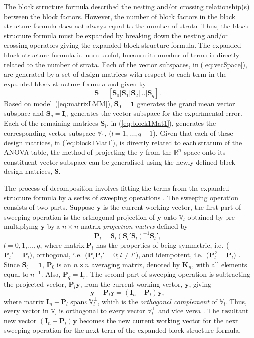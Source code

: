\documentclass[article]{jss}
\newcommand{\mP}{\mathbf{P}}
\newcommand{\I}{\mathbf{I}}
\newcommand{\K}{\mathbf{K}}
\newcommand{\mS}{\mathbf{S}}
\begin{document}
The block structure formula described the nesting and/or crossing relationship(s) between the block factors. However, the number of block factors in the block structure formula does not always equal to the number of strata. Thus, the block structure formula must be expanded by breaking down the nesting and/or crossing operators giving the expanded block structure formula. The expanded block structure formula is more useful, because its number of terms is directly related to the number of strata. Each of the vector subspaces, in (\ref{eq:vecSpace}), are generated by a set of design matrices with respect to each term in the expanded block structure formula and given by
\begin{equation}\label{eq:block1Mat1}
 \mS = [\mS_0 \vert \mS_1 \vert \mS_2 \vert \ldots \vert \mS_q].
\end{equation}
Based on model~(\ref{eq:matrixLMM}), $\mS_0 = \mathbf{1}$ generates the grand mean vector subspace and $\mS_q = \I_n$ generates the vector subspace for the experimental error. Each of the remaining matrices $\mS_l$, in (\ref{eq:block1Mat1}), generates the corresponding vector subspace $\mathbb{V}_1$, ($l = 1, \dots, q-1$). Given that each of these design matrices, in (\ref{eq:block1Mat1}), is directly related to each stratum of the ANOVA table, the method of projecting the $\bm{y}$ from the $\mathbb{R}^n$ space onto its constituent vector subspace can be generalised using the newly defined block design matrices, $\mS$.  

The process of decomposition involves fitting the terms from the expanded structure formula by a series of sweeping operations \citep{Brien1999}. The sweeping operation consists of two parts. Suppose $\bm{y}$ is the current working vector, the first part of sweeping operation is the orthogonal projection of $\bm{y}$ onto $\mathbb{V}_l$ obtained by pre-multiplying $\bm{y}$ by a $n \times n$ matrix \emph{projection matrix} defined by
\begin{equation}\label{eq:projMat}
\mP_{l} = \mS_{l}(\mS_{l}'\mS_{l})^{-1}\mS_{l}',
\end{equation} 
$l = 0, 1, \dots, q$, where matrix $\mP_l$ has the properties of being symmetric, i.e.\ ($\mP_l' = \mP_l$), orthogonal, i.e.\ ($\mP_l\mP_{l}' = 0; l \neq l'$), and idempotent, i.e.\ ($\mP_l^2 = \mP_l$) \citep{Hadi1996}. Since $\mS_0 = \mathbf{1}$, $\mP_{0}$ is an $n \times n$ averaging matrix, denoted by $\K_n$, with all elements equal to ${n}^{-1}$. Also, $\mP_{q} = \I_n$. The second part of sweeping operation is subtracting the projected vector, $\mP_{l}\bm{y}$, from the current working vector, $\bm{y}$, giving 
\[
\bm{y} - \mP_{l}\bm{y} = (\I_n - \mP_{l})\bm{y},
\]
where matrix $\I_n - \mP_{l}$ spans $\mathbb{V}_l^\perp$, which is the \emph{orthogonal complement} of $\mathbb{V}_l$. Thus, every vector in $\mathbb{V}_l$ is orthogonal to  every vector $\mathbb{V}_l^\perp$ and vice versa \citep{Hadi1996}. The resultant new vector $(\I_n - \mP_{l})\bm{y}$ becomes the new current working vector for the next sweeping operation for the next term of the expanded block structure formula. 
\end{document}
